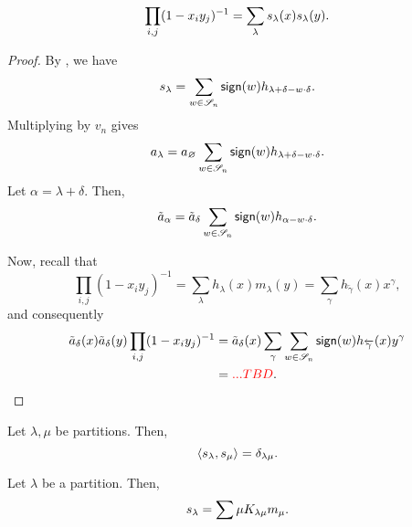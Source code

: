 \begin{theorem}
    \begin{equation}
        \prod_{i, j} (1 - x_i y_j)^{-1} = \sum_{\lambda} s_{\lambda}(x) s_{\lambda}(y).
    \end{equation}
\end{theorem}

\begin{proof}
    By , we have
    \begin{equation}
        s_{\lambda} = \sum_{w \in \mathscr{S}_{n}} \operatorname{\mathsf{sign}}(w) h_{\lambda + \delta - w \cdot \delta}.
    \end{equation}
    Multiplying by \(v_n\) gives
    \begin{equation}
        a_\lambda = a_\varnothing \sum_{w \in \mathscr{S}_{n}} \operatorname{\mathsf{sign}}(w) h_{\lambda + \delta - w \cdot \delta}.
    \end{equation}
    Let \(\alpha = \lambda + \delta\).
    Then,
    \begin{equation}
        \tilde{a}_\alpha = \tilde{a}_\delta \sum_{w \in \mathscr{S}_{n}} \operatorname{\mathsf{sign}}(w) h_{\alpha - w \cdot \delta}.
    \end{equation}

    Now, recall that
    \begin{equation}
        \prod_{i, j} (1 - x_i y_j)^{-1} = \sum_{\lambda} h_\lambda(x) m_\lambda(y) = \sum_{\gamma} h_{\overleftarrow{\gamma}}(x) x^\gamma,
    \end{equation}
    and consequently
    \begin{align}
        \tilde{a}_\delta(x) \tilde{a}_\delta(y) 
        \prod_{i, j} (1 - x_i y_j)^{-1}
        &= \tilde{a}_\delta(x) \sum_{\gamma} \sum_{w \in \mathscr{S}_{n}} \operatorname{\mathsf{sign}}(w) h_{\overleftarrow{\gamma}}(x) y^{\gamma} \\
        &= \textcolor{red}{... TBD}.
    \end{align}
\end{proof}

\begin{corollary}
    Let \(\lambda, \mu\) be partitions.
    Then,
    \begin{equation}
        \langle s_{\lambda}, s_{\mu} \rangle = \delta_{\lambda \mu}.
    \end{equation}
\end{corollary}

\begin{corollary} \label{cor:schur-sum-kostka-m}
    Let \(\lambda\) be a partition.
    Then,
    \begin{equation}
        s_{\lambda} = \sum{\mu} K_{\lambda \mu} m_\mu.
    \end{equation}
\end{corollary}

